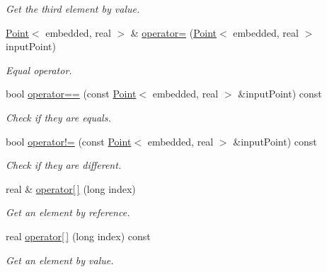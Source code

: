 \begin{DoxyCompactItemize}
\begin{DoxyCompactList}\small\item\em Get the third element by value. \end{DoxyCompactList}\item 
\hyperlink{class_point}{Point}$<$ embedded, real $>$ \& \hyperlink{class_point_a448799c65927e710a92fcd5b715e3b21}{operator=} (\hyperlink{class_point}{Point}$<$ embedded, real $>$ input\+Point)
\begin{DoxyCompactList}\small\item\em Equal operator. \end{DoxyCompactList}\item 
bool \hyperlink{class_point_a85d75524d6a63f080aca5cec2eca7ec9}{operator==} (const \hyperlink{class_point}{Point}$<$ embedded, real $>$ \&input\+Point) const 
\begin{DoxyCompactList}\small\item\em Check if they are equals. \end{DoxyCompactList}\item 
bool \hyperlink{class_point_af3dfd6f86d375de9c2bd412f9ba31c87}{operator!=} (const \hyperlink{class_point}{Point}$<$ embedded, real $>$ \&input\+Point) const 
\begin{DoxyCompactList}\small\item\em Check if they are different. \end{DoxyCompactList}\item 
real \& \hyperlink{class_point_ab8b7d24713bc91d95cced47933f06198}{operator\mbox{[}$\,$\mbox{]}} (long index)\hypertarget{class_point_ab8b7d24713bc91d95cced47933f06198}{}\label{class_point_ab8b7d24713bc91d95cced47933f06198}

\begin{DoxyCompactList}\small\item\em Get an element by reference. \end{DoxyCompactList}\item 
real \hyperlink{class_point_a6fb29d763d4c786452b071e790db86fc}{operator\mbox{[}$\,$\mbox{]}} (long index) const \hypertarget{class_point_a6fb29d763d4c786452b071e790db86fc}{}\label{class_point_a6fb29d763d4c786452b071e790db86fc}

\begin{DoxyCompactList}\small\item\em Get an element by value. \end{DoxyCompactList}\end{DoxyCompactItemize}
